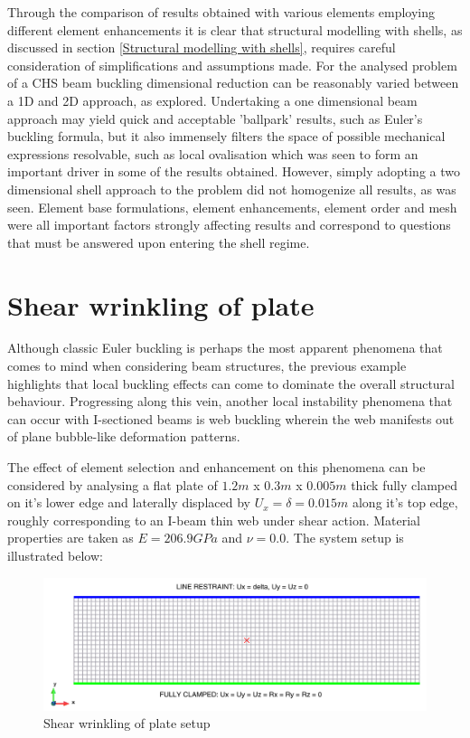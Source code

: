 Through the comparison of results obtained with various elements employing different element enhancements it is clear that structural modelling with shells, as discussed in section \ref{Structural modelling with shells}, requires careful consideration of simplifications and assumptions made. For the analysed problem of a CHS beam buckling dimensional reduction can be reasonably varied between a 1D and 2D approach, as explored. Undertaking a one dimensional beam approach may yield quick and acceptable 'ballpark' results, such as Euler's buckling formula, but it also immensely filters the space of possible mechanical expressions resolvable, such as local ovalisation which was seen to form an important driver in some of the results obtained. However, simply adopting a two dimensional shell approach to the problem did not homogenize all results, as was seen. Element base formulations, element enhancements, element order and mesh were all important factors strongly affecting results and correspond to questions that must be answered upon entering the shell regime. 

\section{Shear wrinkling of plate}

Although classic Euler buckling is perhaps the most apparent phenomena that comes to mind when considering beam structures, the previous example highlights that local buckling effects can come to dominate the overall structural behaviour. Progressing along this vein, another local instability phenomena that can occur with I-sectioned beams is web buckling wherein the web manifests out of plane bubble-like deformation patterns.

The effect of element selection and enhancement on this phenomena can be considered by analysing a flat plate of $1.2m$ x $0.3m$ x $0.005m$ thick fully clamped on it's lower edge and laterally displaced by $U_x = \delta = 0.015m$ along it's top edge, roughly corresponding to an I-beam thin web under shear action. Material properties are taken as $E = 206.9 GPa$ and $\nu = 0.0$. The system setup is illustrated below:

\begin{figure}[H]
	\centering
	\includegraphics[width=12cm]{images/wrinkle_setup}
	\caption{Shear wrinkling of plate setup}
	\label{fig:wrinklesetup}
\end{figure}

